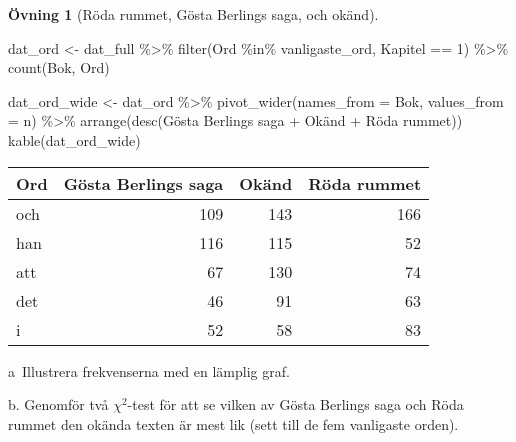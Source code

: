 \documentclass[
]{book}
\newenvironment{Shaded}{\begin{snugshade}}{\end{snugshade}}
\newcommand{\AttributeTok}[1]{\textcolor[rgb]{0.77,0.63,0.00}{#1}}
\newcommand{\DecValTok}[1]{\textcolor[rgb]{0.00,0.00,0.81}{#1}}
\newcommand{\FunctionTok}[1]{\textcolor[rgb]{0.00,0.00,0.00}{#1}}
\newcommand{\NormalTok}[1]{#1}
\newcommand{\OtherTok}[1]{\textcolor[rgb]{0.56,0.35,0.01}{#1}}
\newcommand{\SpecialCharTok}[1]{\textcolor[rgb]{0.00,0.00,0.00}{#1}}
\newcommand{\StringTok}[1]{\textcolor[rgb]{0.31,0.60,0.02}{#1}}
\theoremstyle{definition}
\theoremstyle{definition}
\theoremstyle{definition}
\newtheorem{exercise}{Övning}[chapter]
\theoremstyle{definition}
\theoremstyle{remark}
\begin{document}
\begin{exercise}[Röda rummet, Gösta Berlings saga, och okänd]
\begin{Shaded}
\begin{Highlighting}[]
\NormalTok{dat\_ord }\OtherTok{\textless{}{-}}\NormalTok{ dat\_full }\SpecialCharTok{\%\textgreater{}\%} 
  \FunctionTok{filter}\NormalTok{(Ord }\SpecialCharTok{\%in\%}\NormalTok{ vanligaste\_ord, Kapitel }\SpecialCharTok{==} \DecValTok{1}\NormalTok{) }\SpecialCharTok{\%\textgreater{}\%} 
  \FunctionTok{count}\NormalTok{(Bok, Ord) }

\NormalTok{dat\_ord\_wide }\OtherTok{\textless{}{-}}\NormalTok{ dat\_ord }\SpecialCharTok{\%\textgreater{}\%} 
  \FunctionTok{pivot\_wider}\NormalTok{(}\AttributeTok{names\_from =}\NormalTok{ Bok, }\AttributeTok{values\_from =}\NormalTok{ n) }\SpecialCharTok{\%\textgreater{}\%} 
  \FunctionTok{arrange}\NormalTok{(}\FunctionTok{desc}\NormalTok{(}\StringTok{\textasciigrave{}}\AttributeTok{Gösta Berlings saga}\StringTok{\textasciigrave{}} \SpecialCharTok{+}\NormalTok{ Okänd }\SpecialCharTok{+} \StringTok{\textasciigrave{}}\AttributeTok{Röda rummet}\StringTok{\textasciigrave{}}\NormalTok{))}
\FunctionTok{kable}\NormalTok{(dat\_ord\_wide)}
\end{Highlighting}
\end{Shaded}

\begin{table}
\centering
\begin{tabular}[t]{lrrr}
\toprule
Ord & Gösta Berlings saga & Okänd & Röda rummet\\
\midrule
och & 109 & 143 & 166\\
han & 116 & 115 & 52\\
att & 67 & 130 & 74\\
det & 46 & 91 & 63\\
i & 52 & 58 & 83\\
\bottomrule
\end{tabular}
\end{table}

a~Illustrera frekvenserna med en lämplig graf.

b. Genomför två \(\chi^2\)-test för att se vilken av Gösta Berlings saga och Röda rummet den okända texten är mest lik (sett till de fem vanligaste orden).
\end{exercise}
\end{document}
